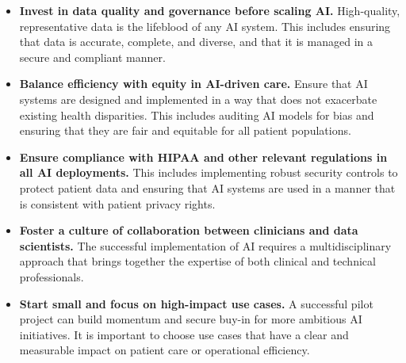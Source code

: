 \begin{itemize}
    \item \textbf{Invest in data quality and governance before scaling AI.} High-quality, representative data is the lifeblood of any AI system. This includes ensuring that data is accurate, complete, and diverse, and that it is managed in a secure and compliant manner.
    \item \textbf{Balance efficiency with equity in AI-driven care.} Ensure that AI systems are designed and implemented in a way that does not exacerbate existing health disparities. This includes auditing AI models for bias and ensuring that they are fair and equitable for all patient populations.
    \item \textbf{Ensure compliance with HIPAA and other relevant regulations in all AI deployments.} This includes implementing robust security controls to protect patient data and ensuring that AI systems are used in a manner that is consistent with patient privacy rights.
    \item \textbf{Foster a culture of collaboration between clinicians and data scientists.} The successful implementation of AI requires a multidisciplinary approach that brings together the expertise of both clinical and technical professionals.
    \item \textbf{Start small and focus on high-impact use cases.} A successful pilot project can build momentum and secure buy-in for more ambitious AI initiatives. It is important to choose use cases that have a clear and measurable impact on patient care or operational efficiency.
\end{itemize}